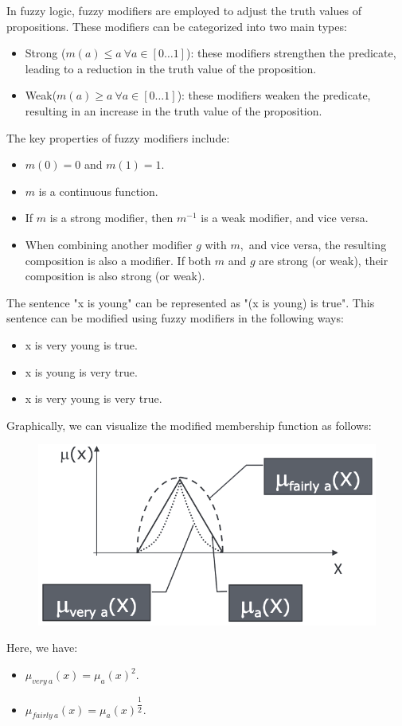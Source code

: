In fuzzy logic, fuzzy modifiers are employed to adjust the truth values of propositions. These modifiers can be categorized into two main types:
\begin{itemize}
    \item Strong ($m(a) \leq a \: \forall a \in [0 \dots 1]$): these modifiers strengthen the predicate, leading to a reduction in the truth value of the proposition.
    \item Weak($m(a) \geq a \: \forall a \in [0 \dots 1]$): these modifiers weaken the predicate, resulting in an increase in the truth value of the proposition.
\end{itemize}
The key properties of fuzzy modifiers include:
\begin{itemize}
    \item $m(0)=0$ and $m(1)=1$.
    \item $m$ is a continuous function. 
    \item If $m$ is a strong modifier, then $m^{-1}$ is a weak modifier, and vice versa.
    \item When combining another modifier $g$ with $m,$ and vice versa, the resulting composition is also a modifier. 
        If both $m$ and $g$ are strong (or weak), their composition is also strong (or weak).
\end{itemize}
\begin{example}
    The sentence "x is young" can be represented as "(x is young) is true". This sentence can be modified using fuzzy modifiers in the following ways:
    \begin{itemize}
        \item x is very young is true.
        \item x is young is very true.
        \item x is very young is very true.
    \end{itemize}
    Graphically, we can visualize the modified membership function as follows:
    \begin{figure}[H]
        \centering
        \includegraphics[width=0.4\linewidth]{images/modifiers.png}
    \end{figure}
    Here, we have:
    \begin{itemize}
        \item $\mu_{very \: a}(x)=\mu_a(x)^2$.
        \item $\mu_{fairly \: a}(x)=\mu_a(x)^{\dfrac{1}{2}}$.
    \end{itemize}
\end{example}